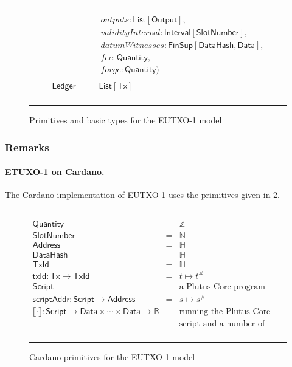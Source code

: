 \documentclass[a4paper]{article}
\renewcommand{\i}{\textit}  %
\newcommand{\s}{\textsf}  %
\newcommand{\msf}[1]{\ensuremath{\mathsf{#1}}}
\newcommand{\mi}[1]{\ensuremath{\mathit{#1}}}
\newcommand\rfskip{7pt}
\newenvironment{ruledfigure}[1]{\begin{figure}[#1]\hrule\vspace{\rfskip}}{\vspace{\rfskip}\hrule\end{figure}}
\newcommand{\hash}[1]{\ensuremath{#1^{\#}}}
\newcommand{\List}[1]{\ensuremath{\s{List}[#1]}}
\newcommand{\Interval}[1]{\ensuremath{\s{Interval}[#1]}}
\newcommand{\FinSup}[2]{\ensuremath{\s{FinSup}[#1,#2]}}
\newcommand{\script}{\ensuremath{\s{Script}}}
\newcommand{\scriptAddr}{\msf{scriptAddr}}
\newcommand{\TxId}{\ensuremath{\s{TxId}}}
\newcommand{\txId}{\msf{txId}}
\newcommand{\Address}{\ensuremath{\s{Address}}}
\newcommand{\DataHash}{\ensuremath{\s{DataHash}}}
\newcommand{\outputs}{\mi{outputs}}
\newcommand{\forge}{\mi{forge}}
\newcommand{\fee}{\mi{fee}}
\newcommand{\datumWits}{\mi{datumWitnesses}}
\newcommand{\Data}{\ensuremath{\s{Data}}}
\newcommand{\slotnum}{\ensuremath{\s{SlotNumber}}}
\newcommand{\eutxotx}{\msf{Tx}}
\newcommand{\qty}{\ensuremath{\s{Quantity}}}
\newcommand{\applyScript}[1]{\ensuremath{\llbracket#1\rrbracket}}
\newcommand\B{\ensuremath{\mathbb{B}}}
\newcommand\N{\ensuremath{\mathbb{N}}}
\newcommand\Z{\ensuremath{\mathbb{Z}}}
\renewcommand\H{\ensuremath{\mathbb{H}}}
\begin{document}
\begin{ruledfigure}{H}
\begin{displaymath}
\begin{array}{rll}
                   & &\ \outputs: \List{\s{Output}},\\
                   & &\ \i{validityInterval}: \Interval{\slotnum},\\
                   & &\ \datumWits: \FinSup{\DataHash}{\Data},\\
                   & &\ \fee: \qty,\\
                   & &\ \forge: \qty) \\
     \\
     \s{Ledger } &=&\!\List{\eutxotx}\\
  \end{array}
  \end{displaymath}
  \caption{Primitives and basic types for the EUTXO-1 model}
  \label{fig:eutxo-1-types}
\end{ruledfigure}

\subsubsection{Remarks}
\paragraph{ETUXO-1 on Cardano.}
The Cardano implementation of EUTXO-1 uses the primitives given in
\cref{fig:eutxo-1-types-cardano}.

\begin{ruledfigure}{H}
  \begin{displaymath}
  \begin{array}{rll}
    \qty{} &=& \Z\\
    \slotnum &=& \N\\
    \Address &=& \H\\
    \DataHash &=& \H\\
    \TxId &=& \H\\
    \txId : \eutxotx \rightarrow \TxId &=& t \mapsto \hash{t}\\
    \script & & \mbox{a Plutus Core program}\\
    \scriptAddr : \script \rightarrow \Address &=& s \mapsto \hash{s}\\
    \applyScript{\cdot} : \script \rightarrow \Data \times \cdots \times
    \Data \rightarrow \B & & \mbox{running the Plutus Core interpreter with a}\\
                             &&\mbox{script and a number of data objects as input}\\
  \end{array}
  \end{displaymath}
  \caption{Cardano primitives for the EUTXO-1 model}
  \label{fig:eutxo-1-types-cardano}
\end{ruledfigure}
\end{document}
